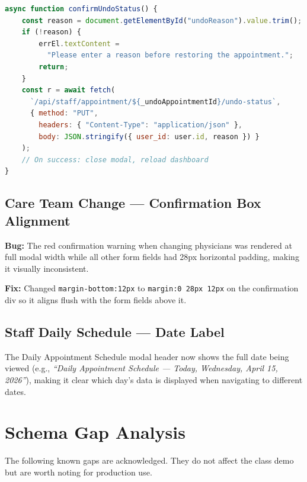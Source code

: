 \documentclass[12pt, letterpaper]{article}
\begin{document}
\begin{lstlisting}[language=JavaScript, caption={Undo confirmation — reason required}]
async function confirmUndoStatus() {
    const reason = document.getElementById("undoReason").value.trim();
    if (!reason) {
        errEl.textContent =
          "Please enter a reason before restoring the appointment.";
        return;
    }
    const r = await fetch(
      `/api/staff/appointment/${_undoAppointmentId}/undo-status`,
      { method: "PUT",
        headers: { "Content-Type": "application/json" },
        body: JSON.stringify({ user_id: user.id, reason }) }
    );
    // On success: close modal, reload dashboard
}
\end{lstlisting}

\subsection{Care Team Change — Confirmation Box Alignment}

\textbf{Bug:} The red confirmation warning when changing physicians was rendered at full modal width while all other form fields had 28px horizontal padding, making it visually inconsistent.

\textbf{Fix:} Changed \texttt{margin-bottom:12px} to \texttt{margin:0 28px 12px} on the confirmation div so it aligns flush with the form fields above it.

\subsection{Staff Daily Schedule — Date Label}

The Daily Appointment Schedule modal header now shows the full date being viewed (e.g., \textit{``Daily Appointment Schedule — Today, Wednesday, April 15, 2026''}), making it clear which day's data is displayed when navigating to different dates.

\section{Schema Gap Analysis}

The following known gaps are acknowledged. They do not affect the class demo but are worth noting for production use.
\end{document}
